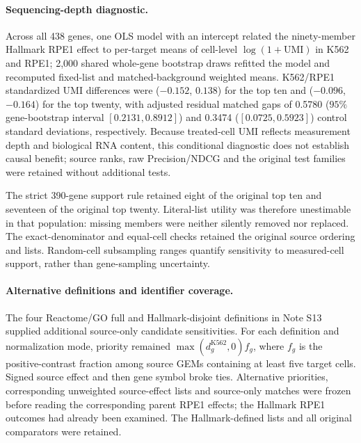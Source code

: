 \documentclass[a4paper,fleqn]{cas-sc}
\makeatletter
\DeclareRobustCommand{\rev}[1]{{\color{red}\def\@citecolor{black}\def\@linkcolor{red}\def\@urlcolor{red}#1}}
\makeatother
\begin{document}
\paragraph{\rev{Sequencing-depth diagnostic.}}
\rev{Across all 438 genes, one OLS model with an intercept related the ninety-member Hallmark RPE1 effect to per-target means of cell-level $\log(1+\mathrm{UMI})$ in K562 and RPE1; 2,000 shared whole-gene bootstrap draws refitted the model and recomputed fixed-list and matched-background weighted means.} \rev{K562/RPE1 standardized UMI differences were ($-0.152$, $0.138$) for the top ten and ($-0.096$, $-0.164$) for the top twenty, with adjusted residual matched gaps of 0.5780 ($95\%$ gene-bootstrap interval $[0.2131,0.8912]$) and 0.3474 ($[0.0725,0.5923]$) control standard deviations, respectively.} \rev{Because treated-cell UMI reflects measurement depth and biological RNA content, this conditional diagnostic does not establish causal benefit; source ranks, raw Precision/NDCG and the original test families were retained without additional tests.}

\rev{The strict 390-gene support rule retained eight of the original top ten and seventeen of the original top twenty.} \rev{Literal-list utility was therefore unestimable in that population: missing members were neither silently removed nor replaced.} \rev{The exact-denominator and equal-cell checks retained the original source ordering and lists.} \rev{Random-cell subsampling ranges quantify sensitivity to measured-cell support, rather than gene-sampling uncertainty.}

\paragraph{\rev{Alternative definitions and identifier coverage.}}
\rev{The four Reactome/GO full and Hallmark-disjoint definitions in Note S13 supplied additional source-only candidate sensitivities.} \rev{For each definition and normalization mode, priority remained $\max(d_g^{\mathrm{K562}},0)f_g$, where $f_g$ is the positive-contrast fraction among source GEMs containing at least five target cells.} \rev{Signed source effect and then gene symbol broke ties.} \rev{Alternative priorities, corresponding unweighted source-effect lists and source-only matches were frozen before reading the corresponding parent RPE1 effects; the Hallmark RPE1 outcomes had already been examined.} \rev{The Hallmark-defined lists and all original comparators were retained.}
\end{document}
